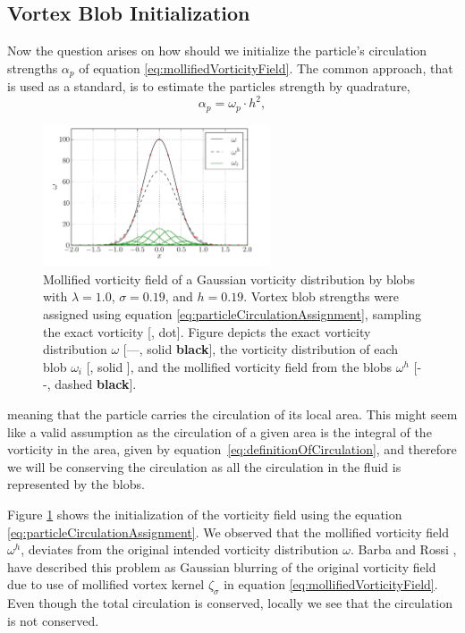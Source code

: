 \subsection{Vortex Blob Initialization}
\label{subsec:vortexBlobInitialization}
Now the question arises on how should we initialize the particle's circulation strengths $\alpha_p$ of equation 	\ref{eq:mollifiedVorticityField}. The common approach, that is used as a standard, is to estimate the particles strength by quadrature,
	\begin{equation}
	\alpha_p = \omega_p\cdot h^2,
	\label{eq:particleCirculationAssignment}
	\end{equation}

	\begin{figure}[!b]
	\centering
	\includegraphics[width=0.6\textwidth]{figures/lagrangian/particleInitialization.pdf}
	\caption{Mollified vorticity field of a Gaussian vorticity distribution by blobs with $\lambda=1.0$, $\sigma=0.19$, and $h=0.19$. Vortex blob strengths were assigned using equation \ref{eq:particleCirculationAssignment}, sampling the exact vorticity [{\color{plotRed}{$\bullet$}}, {} dot]. Figure depicts the exact vorticity distribution $\omega$ [---, solid \textbf{black}], the vorticity distribution of each blob $\omega_i$ [{\color{darkgreen}{---}}, solid {}], and the mollified vorticity field from the blobs $\omega^h$ [- -, dashed \textbf{black}].  }
	\label{fig:particleInitialization}
	\end{figure}

meaning that the particle carries the circulation of its local area. This might seem like a valid assumption as the circulation of a given area is the integral of the vorticity in the area, given by equation\ \ref{eq:definitionOfCirculation}, and therefore we will be conserving the circulation as all the circulation in the fluid is represented by the blobs.

Figure \ref{fig:particleInitialization} shows the initialization of the vorticity field using the equation 	\ref{eq:particleCirculationAssignment}. We observed that the mollified vorticity field $\omega^h$, deviates from the original intended vorticity distribution $\omega$. Barba and Rossi \cite{Barba2010a}, have described this problem as Gaussian blurring of the original vorticity field due to use of mollified vortex kernel $\zeta_{\sigma}$ in equation 	\ref{eq:mollifiedVorticityField}. Even though the total circulation is conserved, locally we see that the circulation is not conserved. 


